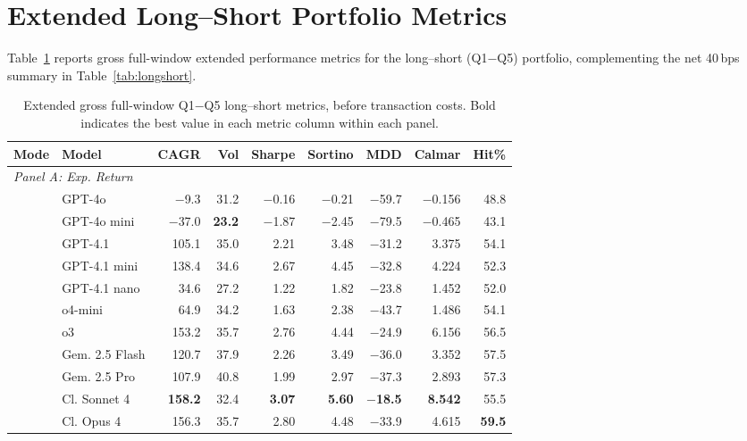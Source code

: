 \section{Extended Long--Short Portfolio Metrics}
\label{app:ls-extended}

Table~\ref{tab:ls-extended} reports gross full-window extended performance metrics for the long--short (Q1$-$Q5) portfolio, complementing the net 40\,bps summary in Table~\ref{tab:longshort}.

\begin{table}[H]
\centering
\caption{Extended gross full-window Q1$-$Q5 long--short metrics, before transaction costs. Bold indicates the best value in each metric column within each panel.}
\label{tab:ls-extended}
\scriptsize
\setlength{\tabcolsep}{3pt}
\renewcommand{\arraystretch}{0.80}
\begin{adjustbox}{width=\textwidth,totalheight=0.78\textheight,keepaspectratio}
\begin{tabular}{ll rrrrrrr}
\toprule
\textbf{Mode} & \textbf{Model} & \textbf{CAGR} & \textbf{Vol} & \textbf{Sharpe} & \textbf{Sortino} & \textbf{MDD} & \textbf{Calmar} & \textbf{Hit\%} \\
\midrule
\multicolumn{9}{l}{\textit{Panel A: Exp. Return}} \\
\midrule
& GPT-4o & $-$9.3 & 31.2 & $-$0.16 & $-$0.21 & $-$59.7 & $-$0.156 & 48.8 \\
& GPT-4o mini & $-$37.0 & \textbf{23.2} & $-$1.87 & $-$2.45 & $-$79.5 & $-$0.465 & 43.1 \\
& GPT-4.1 & 105.1 & 35.0 & 2.21 & 3.48 & $-$31.2 & 3.375 & 54.1 \\
& GPT-4.1 mini & 138.4 & 34.6 & 2.67 & 4.45 & $-$32.8 & 4.224 & 52.3 \\
& GPT-4.1 nano & 34.6 & 27.2 & 1.22 & 1.82 & $-$23.8 & 1.452 & 52.0 \\
& o4-mini & 64.9 & 34.2 & 1.63 & 2.38 & $-$43.7 & 1.486 & 54.1 \\
& o3 & 153.2 & 35.7 & 2.76 & 4.44 & $-$24.9 & 6.156 & 56.5 \\
\cmidrule(l){2-9}
& Gem. 2.5 Flash & 120.7 & 37.9 & 2.26 & 3.49 & $-$36.0 & 3.352 & 57.5 \\
& Gem. 2.5 Pro & 107.9 & 40.8 & 1.99 & 2.97 & $-$37.3 & 2.893 & 57.3 \\
\cmidrule(l){2-9}
& Cl. Sonnet 4 & \textbf{158.2} & 32.4 & \textbf{3.07} & \textbf{5.60} & \textbf{$-$18.5} & \textbf{8.542} & 55.5 \\
& Cl. Opus 4 & 156.3 & 35.7 & 2.80 & 4.48 & $-$33.9 & 4.615 & \textbf{59.5} \\

\end{tabular}
\end{adjustbox}
\end{table}
